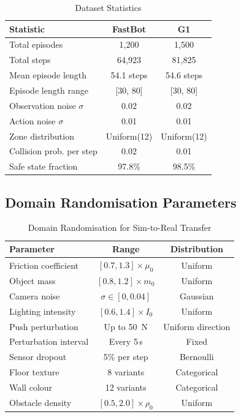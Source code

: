 \documentclass[conference]{IEEEtran}
\begin{document}
\begin{table}[h]
\centering
\caption{Dataset Statistics}
\begin{tabular}{@{}lcc@{}}
\toprule
\textbf{Statistic} & \textbf{FastBot} & \textbf{G1} \\
\midrule
Total episodes & 1{,}200 & 1{,}500 \\
Total steps & 64{,}923 & 81{,}825 \\
Mean episode length & 54.1 steps & 54.6 steps \\
Episode length range & [30, 80] & [30, 80] \\
Observation noise $\sigma$ & 0.02 & 0.02 \\
Action noise $\sigma$ & 0.01 & 0.01 \\
Zone distribution & Uniform(12) & Uniform(12) \\
Collision prob. per step & 0.02 & 0.01 \\
Safe state fraction & 97.8\% & 98.5\% \\
\bottomrule
\end{tabular}
\end{table}

\subsection{Domain Randomisation Parameters}

\begin{table}[h]
\centering
\caption{Domain Randomisation for Sim-to-Real Transfer}
\begin{tabular}{@{}lcc@{}}
\toprule
\textbf{Parameter} & \textbf{Range} & \textbf{Distribution} \\
\midrule
Friction coefficient & $[0.7, 1.3] \times \mu_0$ & Uniform \\
Object mass & $[0.8, 1.2] \times m_0$ & Uniform \\
Camera noise & $\sigma \in [0, 0.04]$ & Gaussian \\
Lighting intensity & $[0.6, 1.4] \times I_0$ & Uniform \\
Push perturbation & Up to \SI{50}{\newton} & Uniform direction \\
Perturbation interval & Every 5\,s & Fixed \\
Sensor dropout & 5\% per step & Bernoulli \\
Floor texture & 8 variants & Categorical \\
Wall colour & 12 variants & Categorical \\
Obstacle density & $[0.5, 2.0] \times \rho_0$ & Uniform \\
\bottomrule
\end{tabular}
\end{table}
\end{document}
